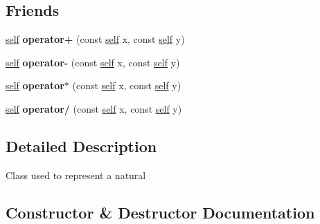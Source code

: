 \subsection*{Friends}
\begin{DoxyCompactItemize}
\item 
\mbox{\label{classez_1_1objects_1_1LongNatural_ac219ecb06730e7707b9bb78b5da63c3b}} 
\hyperlink{classez_1_1objects_1_1LongNatural}{self} {\bfseries operator+} (const \hyperlink{classez_1_1objects_1_1LongNatural}{self} x, const \hyperlink{classez_1_1objects_1_1LongNatural}{self} y)
\item 
\mbox{\label{classez_1_1objects_1_1LongNatural_a6750cba02a1d652b1bd892bfba555e50}} 
\hyperlink{classez_1_1objects_1_1LongNatural}{self} {\bfseries operator-\/} (const \hyperlink{classez_1_1objects_1_1LongNatural}{self} x, const \hyperlink{classez_1_1objects_1_1LongNatural}{self} y)
\item 
\mbox{\label{classez_1_1objects_1_1LongNatural_a4f9af882c7a074ed8e1f8da41bd31dc9}} 
\hyperlink{classez_1_1objects_1_1LongNatural}{self} {\bfseries operator$\ast$} (const \hyperlink{classez_1_1objects_1_1LongNatural}{self} x, const \hyperlink{classez_1_1objects_1_1LongNatural}{self} y)
\item 
\mbox{\label{classez_1_1objects_1_1LongNatural_aa69c5e8b6898bb99a6f4d6e8962560c8}} 
\hyperlink{classez_1_1objects_1_1LongNatural}{self} {\bfseries operator/} (const \hyperlink{classez_1_1objects_1_1LongNatural}{self} x, const \hyperlink{classez_1_1objects_1_1LongNatural}{self} y)
\end{DoxyCompactItemize}


\subsection{Detailed Description}
Class used to represent a natural 

\subsection{Constructor \& Destructor Documentation}
\mbox{\label{classez_1_1objects_1_1LongNatural_a468b880a237b7dec2051986414e809b6}} 

